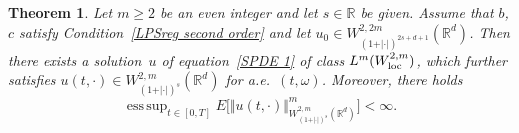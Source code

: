 \documentclass[a4paper,10pt]{article}
\newtheorem{theorem}{Theorem}[section]
\newcommand\1{\mathbbm{1}}
\newcommand\loc{{\rm loc}}
\DeclareMathOperator*{\esssup}{ess\,sup}
\numberwithin{equation}{section}
\begin{document}
\begin{theorem}
\label{Theo existence regular sol second order}Let $m\geq2$ be an even
integer and let $s\in\mathbb{R}$ be given. Assume that $b$, $c$ satisfy Condition~\ref{LPSreg second order} and let $u_{0}\in W_{(1+\vert \cdot\vert )^{2s+d+1}}^{2,2m}(\mathbb{R}^{d})$. Then there exists a solution~$u$ of equation~\eqref{SPDE 1} of class $L^{m}(W_{\loc}^{2,m})$, which further satisfies $u(t,\cdot)\in W_{(1+\vert \cdot \vert)^{s}}^{2,m}(\mathbb{R}^{d})$ for a.e.~$(t,\omega)$. Moreover, there holds
\begin{equation*}
\esssup_{t\in[  0,T]  }E\Big[  \Vert u(t,\cdot) \Vert_{W_{(1+ \vert \cdot \vert)^{s}}^{2,m}(
\mathbb{R}^{d})}^{m}\Big]  <\infty . 
\end{equation*}
\end{theorem}
\end{document}
